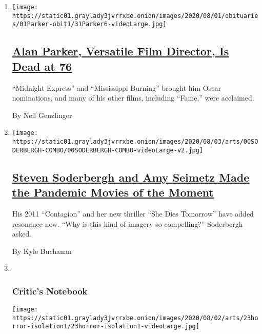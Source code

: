 \begin{enumerate}
\def\labelenumi{\arabic{enumi}.}
\item
  \texttt{[image: https://static01.graylady3jvrrxbe.onion/images/2020/08/01/obituaries/01Parker-obit1/31Parker6-videoLarge.jpg]}

  \hypertarget{alan-parker-versatile-film-director-is-dead-at-76}{%
  \subsection{\texorpdfstring{\href{/2020/07/31/movies/alan-parker-versatile-film-director-is-dead-at-76.html}{Alan
  Parker, Versatile Film Director, Is Dead at
  76}}{Alan Parker, Versatile Film Director, Is Dead at 76}}\label{alan-parker-versatile-film-director-is-dead-at-76}}

  ``Midnight Express'' and ``Mississippi Burning'' brought him Oscar
  nominations, and many of his other films, including ``Fame,'' were
  acclaimed.

  By Neil Genzlinger
\item
  \texttt{[image: https://static01.graylady3jvrrxbe.onion/images/2020/08/03/arts/00SODERBERGH-COMBO/00SODERBERGH-COMBO-videoLarge-v2.jpg]}

  \hypertarget{steven-soderbergh-and-amy-seimetz-made-the-pandemic-movies-of-the-moment}{%
  \subsection{\texorpdfstring{\href{/2020/07/31/movies/steven-soderbergh-amy-seimetz-pandemic.html}{Steven
  Soderbergh and Amy Seimetz Made the Pandemic Movies of the
  Moment}}{Steven Soderbergh and Amy Seimetz Made the Pandemic Movies of the Moment}}\label{steven-soderbergh-and-amy-seimetz-made-the-pandemic-movies-of-the-moment}}

  His 2011 ``Contagion'' and her new thriller ``She Dies Tomorrow'' have
  added resonance now. ``Why is this kind of imagery so compelling?''
  Soderbergh asked.

  By Kyle Buchanan
\item ~
  \hypertarget{critics-notebook}{%
  \subsubsection{Critic's Notebook}\label{critics-notebook}}

  \texttt{[image: https://static01.graylady3jvrrxbe.onion/images/2020/08/02/arts/23horror-isolation1/23horror-isolation1-videoLarge.jpg]}


\end{enumerate}
